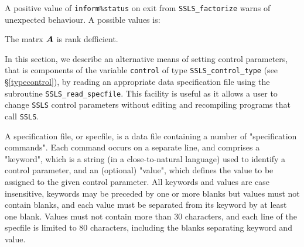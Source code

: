 \documentclass{galahad}
\newcommand{\packagename}{SSLS}
\begin{document}
A positive value of {\tt inform\%status} on exit from
{\tt \packagename\_factorize} warns of unexpected behaviour.
A possible values is:

\begin{description}

 The matrx ${\bm{A}}$ is rank defficient.

\end{description}


\galfeatures
\noindent In this section, we describe an alternative means of setting
control parameters, that is components of the variable {\tt control} of type
{\tt \packagename\_control\_type}
(see \S\ref{typecontrol}),
by reading an appropriate data specification file using the
subroutine {\tt \packagename\_read\_specfile}. This facility
is useful as it allows a user to change  {\tt \packagename} control parameters
without editing and recompiling programs that call {\tt \packagename}.

A specification file, or specfile, is a data file containing a number of
"specification commands". Each command occurs on a separate line,
and comprises a "keyword",
which is a string (in a close-to-natural language) used to identify a
control parameter, and
an (optional) "value", which defines the value to be assigned to the given
control parameter. All keywords and values are case insensitive,
keywords may be preceded by one or more blanks but
values must not contain blanks, and
each value must be separated from its keyword by at least one blank.
Values must not contain more than 30 characters, and
each line of the specfile is limited to 80 characters,
including the blanks separating keyword and value.
\end{document}
